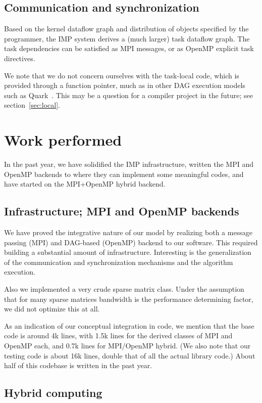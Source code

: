 \documentclass[11pt,fleqn,preprint]{impreport}
\begin{document}
\subsection{Communication and synchronization}

Based on the kernel dataflow graph and distribution of objects
specified by the programmer, the IMP system derives a
(much larger) task dataflow graph.
The task dependencies can be satisfied as MPI messages,
or as OpenMP explicit task directives.

We note that we do not concern ourselves with the task-local code,
which is provided through a function pointer, much as in other
\ac{DAG} execution models such as Quark~\cite{Yarkhan:quark-report}.
This may be a question for a compiler project in the future; see
section~\ref{sec:local}.

\section{Work performed}

In the past year, we have solidified the IMP infrastructure,
written the MPI and OpenMP backends to where they can implement
some meaningful codes, and have started on the MPI+OpenMP hybrid
backend.

\subsection{Infrastructure; MPI and OpenMP backends}

We have proved the integrative nature of our model by realizing both a
message passing (MPI) and DAG-based (OpenMP) backend to our software.
This required building a substantial amount of
infrastructure. Interesting is the generalization of the communication
and synchronization mechanisms and the  algorithm execution.

Also we implemented a very crude sparse matrix class. Under the assumption that
for many sparse matrices bandwidth is the performance determining factor,
we did not optimize this at all.

As an indication of our conceptual integration in code, we mention that
the base code is around 4k lines, with 1.5k lines for
the derived classes of MPI and OpenMP each,
and 0.7k lines for MPI/OpenMP hybrid. (We also note that our testing
code is about 16k lines, double that of all the actual library code.)
About half of this codebase is written in the past year.

\subsection{Hybrid computing}
\label{sec:hybrid}
\end{document}
